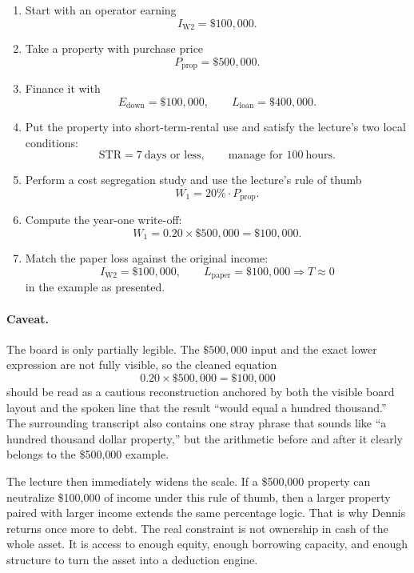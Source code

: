 \begin{enumerate}
\item Start with an operator earning
\[
I_{\mathrm{W2}}=\$100{,}000.
\]

\item Take a property with purchase price
\[
P_{\mathrm{prop}}=\$500{,}000.
\]

\item Finance it with
\[
E_{\mathrm{down}}=\$100{,}000,
\qquad
L_{\mathrm{loan}}=\$400{,}000.
\]

\item Put the property into short-term-rental use and satisfy the lecture's two local conditions:
\[
\mathrm{STR}=7\ \text{days or less},
\qquad
\text{manage for }100\ \text{hours}.
\]

\item Perform a cost segregation study and use the lecture's rule of thumb
\[
W_{1}=20\%\cdot P_{\mathrm{prop}}.
\]

\item Compute the year-one write-off:
\[
W_{1}=0.20\times \$500{,}000=\$100{,}000.
\]

\item Match the paper loss against the original income:
\[
I_{\mathrm{W2}}=\$100{,}000,
\qquad
L_{\mathrm{paper}}=\$100{,}000
\Rightarrow
T\approx 0
\]
in the example as presented.
\end{enumerate}

\paragraph{Caveat.} The board is only partially legible. The \(\$500{,}000\) input and the exact lower expression are not fully visible, so the cleaned equation
\[
0.20\times \$500{,}000=\$100{,}000
\]
should be read as a cautious reconstruction anchored by both the visible board layout and the spoken line that the result ``would equal a hundred thousand.'' The surrounding transcript also contains one stray phrase that sounds like ``a hundred thousand dollar property,'' but the arithmetic before and after it clearly belongs to the \$500{,}000 example.

The lecture then immediately widens the scale. If a \$500{,}000 property can neutralize \$100{,}000 of income under this rule of thumb, then a larger property paired with larger income extends the same percentage logic. That is why Dennis returns once more to debt. The real constraint is not ownership in cash of the whole asset. It is access to enough equity, enough borrowing capacity, and enough structure to turn the asset into a deduction engine.

